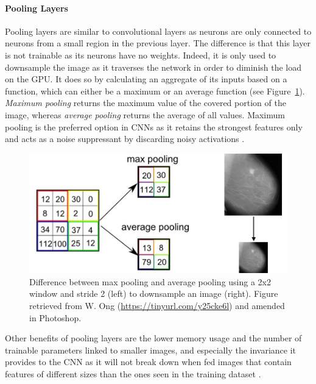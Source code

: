 \paragraph{Pooling Layers}

Pooling layers are similar to convolutional layers as neurons are only connected to neurons from a small region in the previous layer. The difference is that this layer is not trainable as its neurons have no weights. Indeed, it is only used to downsample the image as it traverses the network in order to diminish the load on the GPU. It does so by calculating an aggregate of its inputs based on a function, which can either be a maximum or an average function (see Figure~\ref{fig:litsurvey-max-vs-avg-pooling}). \textit{Maximum pooling} returns the maximum value of the covered portion of the image, whereas \textit{average pooling} returns the average of all values. Maximum pooling is the preferred option in CNNs as it retains the strongest features only and acts as a noise suppressant by discarding noisy activations \citep{Geron2019}.\\

\begin{figure}[ht]
\centerline{\includegraphics[width=\textwidth]{figures/litsurvey/max-vs-avg-pooling.png}}
\caption{\label{fig:litsurvey-max-vs-avg-pooling}Difference between max pooling and average pooling using a 2x2 window and stride 2 (left) to downsample an image (right). Figure retrieved from W. Ong (\url{https://tinyurl.com/y25cke6l}) and amended in Photoshop.}
\end{figure}

Other benefits of pooling layers are the lower memory usage and the number of trainable parameters linked to smaller images, and especially the invariance it provides to the CNN as it will not break down when fed images that contain features of different sizes than the ones seen in the training dataset \citep{Shen2017}.

